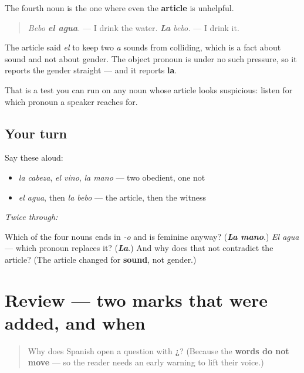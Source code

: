 \begin{grammarlens}[title={Grammar Lens: when the ending will not tell you}]
The fourth noun is the one where even the \textbf{article} is unhelpful.

\begin{quote}
\emph{Bebo \textbf{el agua}.} — I drink the water. \emph{\textbf{La} bebo.} — I drink it.
\end{quote}

The article said \emph{el} to keep two \emph{a} sounds from colliding, which is a fact about sound and not about gender. The object pronoun is under no such pressure, so it reports the gender straight — and it reports \textbf{la}.

That is a test you can run on any noun whose article looks suspicious: listen for which pronoun a speaker reaches for.
\end{grammarlens}

\subsection*{Your turn}
Say these aloud:

\begin{itemize}
\raggedright
  \item \emph{la cabeza}, \emph{el vino}, \emph{la mano} — two obedient, one not
  \item \emph{el agua}, then \emph{la bebo} — the article, then the witness
\end{itemize}

\emph{Twice through:}

\begin{tcolorbox}[breakable,colback=teal!4,colframe=teal!35!black,title={Before you move on}]
Which of the four nouns ends in \emph{-o} and is feminine anyway? (\emph{\textbf{La mano}}.) \emph{El agua} — which pronoun replaces it? (\emph{\textbf{La}}.) And why does that not contradict the article? (The article changed for \textbf{sound}, not gender.)
\end{tcolorbox}
\section[(review)]{Review — two marks that were added, and when}

\label{lesson:ES-C318-repaso-marcas}



\begin{quote}
Why does Spanish open a question with \textbf{¿}? (Because the \textbf{words do not move} — so the reader needs an early warning to lift their voice.)
\end{quote}

